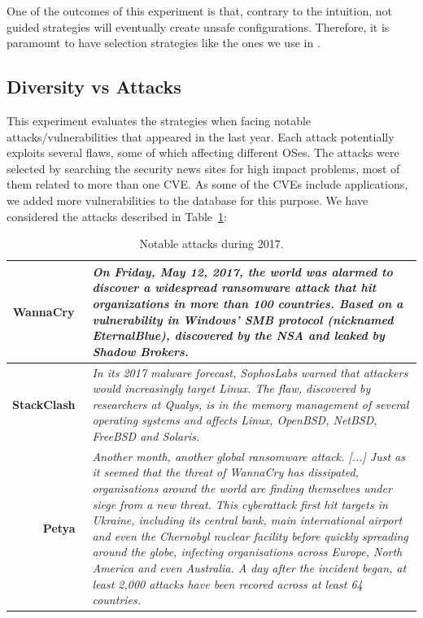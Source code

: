 One of the outcomes of this experiment is that, contrary to the intuition, not guided strategies will eventually create unsafe configurations.
Therefore, it is paramount to have selection strategies like the ones we use in \system.

\subsection{Diversity vs Attacks}


This experiment evaluates the strategies when facing notable attacks/vulnerabilities that appeared in the last year. 
Each attack potentially exploits several flaws, some of which affecting different OSes. 
The attacks were selected by searching the security news sites for high impact problems, most of them related to more than one CVE. 
As some of the CVEs include applications, we added more vulnerabilities to the database for this purpose. 
We have considered the attacks described in Table~\ref{tab:special_vulns}: 

\begin{table}[t]
{\scriptsize

\begin{tabular}{  | r  p{} | }\hline
\textbf{WannaCry}~\cite{wannacry} & \emph{On Friday, May 12, 2017, the world was alarmed to discover a widespread ransomware attack that hit organizations in more than 100 countries. Based on a vulnerability in Windows' SMB protocol (nicknamed EternalBlue), discovered by the NSA and leaked by Shadow Brokers.} \\ \hline

\textbf{StackClash}~\cite{stacklash} & \emph{In its 2017 malware forecast, SophosLabs warned that attackers would increasingly target Linux. The flaw, discovered by researchers at Qualys, is in the memory management of several operating systems and affects Linux, OpenBSD, NetBSD, FreeBSD and Solaris.}\\ \hline

\textbf{Petya}~\cite{petya} & \emph{Another month, another global ransomware attack. [...] Just as it seemed that the threat of WannaCry has dissipated, organisations around the world are finding themselves under siege from a new threat. This cyberattack first hit targets in Ukraine, including its central bank, main international airport and even the Chernobyl nuclear facility before quickly spreading around the globe, infecting organisations across Europe, North America and even Australia. A day after the incident began, at least 2,000 attacks have been recored across at least 64 countries.}\\ \hline
\end{tabular}
}

\caption{Notable attacks during 2017.}
\label{tab:special_vulns}
\end{table}


